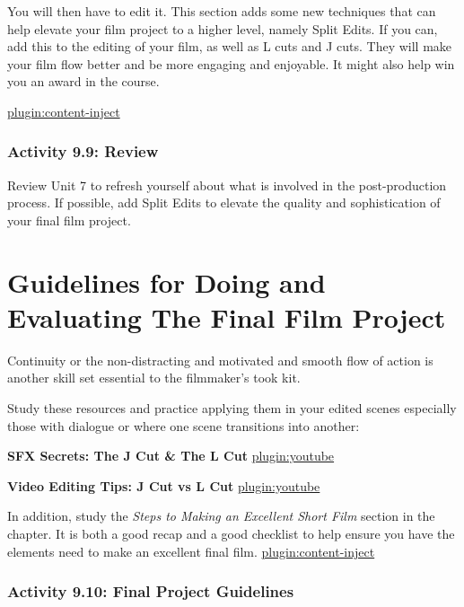 \documentclass[
]{book}
\begin{document}
You will then have to edit it. This section adds some new techniques that can help elevate your film project to a higher level, namely Split Edits. If you can, add this to the editing of your film, as well as L cuts and J cuts. They will make your film flow better and be more engaging and enjoyable. It might also help win you an award in the course.

\href{../_9-9-2}{plugin:content-inject}

\hypertarget{activity-9.9-review}{%
\subsubsection*{Activity 9.9: Review}\label{activity-9.9-review}}

Review Unit 7 to refresh yourself about what is involved in the post-production process. If possible, add Split Edits to elevate the quality and sophistication of your final film project.

\hypertarget{guidelines-for-doing-and-evaluating-the-final-film-project}{%
\section*{Guidelines for Doing and Evaluating The Final Film Project}\label{guidelines-for-doing-and-evaluating-the-final-film-project}}

Continuity or the non-distracting and motivated and smooth flow of action is another skill set essential to the filmmaker's took kit.

Study these resources and practice applying them in your edited scenes especially those with dialogue or where one scene transitions into another:

\textbf{SFX Secrets: The J Cut \& The L Cut}
\href{https://www.youtube.com/watch?v=eyH-a964kAs}{plugin:youtube}

\textbf{Video Editing Tips: J Cut vs L Cut}
\href{https://www.youtube.com/watch?v=fT5rRPMnka0}{plugin:youtube}

In addition, study the \emph{Steps to Making an Excellent Short Film} section in the chapter. It is both a good recap and a good checklist to help ensure you have the elements need to make an excellent final film.
\href{../_9-10}{plugin:content-inject}

\hypertarget{activity-9.10-final-project-guidelines}{%
\subsubsection*{Activity 9.10: Final Project Guidelines}\label{activity-9.10-final-project-guidelines}}
\end{document}
